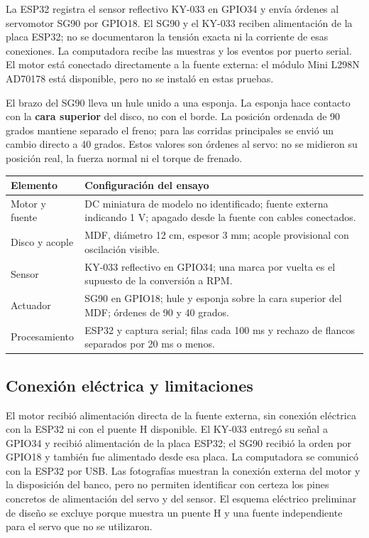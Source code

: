 \documentclass[9pt,a4paper,twocolumn]{extarticle}
\begin{document}
La ESP32 registra el sensor reflectivo KY-033 en GPIO34 y envía
órdenes al servomotor SG90 por GPIO18. El SG90 y el KY-033 reciben
alimentación de la placa ESP32; no se documentaron la tensión exacta
ni la corriente de esas conexiones. La computadora recibe las
muestras y los eventos por puerto serial. El motor está conectado
directamente a la fuente externa: el módulo Mini L298N AD70178 está
disponible, pero no se instaló en estas pruebas.

El brazo del SG90 lleva un hule unido a una esponja. La esponja hace
contacto con la \textbf{cara superior} del disco, no con el borde.
La posición ordenada de 90 grados mantiene separado el freno; para
las corridas principales se envió un cambio directo a 40 grados.
Estos valores son órdenes al servo: no se midieron su posición real,
la fuerza normal ni el torque de frenado.

\begin{center}\begingroup\footnotesize\setlength{\tabcolsep}{3pt}
\begin{tabularx}{\columnwidth}{@{}p{}Y@{}}
\toprule
\textbf{Elemento} & \textbf{Configuración del ensayo}\\
\midrule
Motor y fuente & DC miniatura de modelo no identificado; fuente externa indicando 1 V; apagado desde la fuente con cables conectados.\\
Disco y acople & MDF, diámetro 12 cm, espesor 3 mm; acople provisional con oscilación visible.\\
Sensor & KY-033 reflectivo en GPIO34; una marca por vuelta es el supuesto de la conversión a RPM.\\
Actuador & SG90 en GPIO18; hule y esponja sobre la cara superior del MDF; órdenes de 90 y 40 grados.\\
Procesamiento & ESP32 y captura serial; filas cada 100 ms y rechazo de flancos separados por 20 ms o menos.\\
\bottomrule
\end{tabularx}\endgroup\end{center}

\subsection{Conexión eléctrica y limitaciones}

El motor recibió alimentación directa de la fuente externa,
sin conexión eléctrica con la ESP32 ni con el puente H disponible.
El KY-033 entregó su señal a GPIO34 y recibió alimentación de la
placa ESP32; el SG90 recibió la orden por GPIO18 y también fue
alimentado desde esa placa. La computadora se comunicó con la
ESP32 por USB. Las fotografías muestran la conexión externa del
motor y la disposición del banco, pero no permiten identificar
con certeza los pines concretos de alimentación del servo y del
sensor. El esquema eléctrico
preliminar de diseño se excluye porque muestra un puente H y una
fuente independiente para el servo que no se utilizaron.
\end{document}
